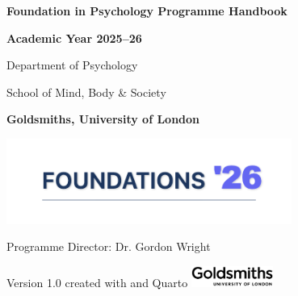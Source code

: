 
\begin{titlepage}
  \centering

  \vspace*{1cm}

  {\color{goldsmithsblue}\Huge\bfseries Foundation in Psychology Programme Handbook} 

  \vspace{0.25cm}

  {\color{goldsmithsgold}\Large\textbf{Academic Year 2025--26}}

  \vspace{1cm}
  
  {\large Department of Psychology}

  \vspace{0.25cm}

  {\large School of Mind, Body \& Society}
  
  \vspace{0.25cm}

  
  {\color{goldsmithsgold}\Large\textbf{Goldsmiths, University of London}}
  
  \vspace{1cm}

  \includegraphics[width=0.7\textwidth]{foundations-logo-transparent.png}

  \vspace{3cm}

  {\large Programme Director: Dr. Gordon Wright}
  
  \vfill
  
  {\small Version 1.0 created with {\color{red}\faHeart{}} and Quarto} \hfill \includegraphics[width=0.2\textwidth]{goldsmiths-logo.png}
\end{titlepage}

\clearpage